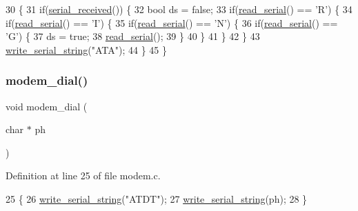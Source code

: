 \begin{DoxyCode}
30                      \{
31     \textcolor{keywordflow}{if}(\hyperlink{a00056_af10f0e64ba89e8635aa7245ca08297c5_af10f0e64ba89e8635aa7245ca08297c5}{serial\_received}()) \{
32         \textcolor{keywordtype}{bool} ds = \textcolor{keyword}{false};
33         \textcolor{keywordflow}{if}(\hyperlink{a00056_ad343a7018f74662f794968dfa0523841_ad343a7018f74662f794968dfa0523841}{read\_serial}() == \textcolor{charliteral}{'R'}) \{
34             \textcolor{keywordflow}{if}(\hyperlink{a00056_ad343a7018f74662f794968dfa0523841_ad343a7018f74662f794968dfa0523841}{read\_serial}() == \textcolor{charliteral}{'I'}) \{
35                 \textcolor{keywordflow}{if}(\hyperlink{a00056_ad343a7018f74662f794968dfa0523841_ad343a7018f74662f794968dfa0523841}{read\_serial}() == \textcolor{charliteral}{'N'}) \{
36                     \textcolor{keywordflow}{if}(\hyperlink{a00056_ad343a7018f74662f794968dfa0523841_ad343a7018f74662f794968dfa0523841}{read\_serial}() == \textcolor{charliteral}{'G'}) \{
37                         ds = \textcolor{keyword}{true};
38                         \hyperlink{a00056_ad343a7018f74662f794968dfa0523841_ad343a7018f74662f794968dfa0523841}{read\_serial}();
39                     \}
40                 \}
41             \}
42         \}
43         \hyperlink{a00056_aabbe45d6670f606c53ba38a5fb14b650_aabbe45d6670f606c53ba38a5fb14b650}{write\_serial\_string}(\textcolor{stringliteral}{"ATA"});
44     \}
45 \}
\end{DoxyCode}
\mbox{\label{a00047_ab1123a026be8f7d0ece72e2813222da0_ab1123a026be8f7d0ece72e2813222da0}} 
\subsubsection{\texorpdfstring{modem\+\_\+dial()}{modem\_dial()}}
{\footnotesize\ttfamily void modem\+\_\+dial (\begin{DoxyParamCaption}\item[{char $\ast$}]{ph }\end{DoxyParamCaption})}



Definition at line 25 of file modem.\+c.


\begin{DoxyCode}
25                           \{
26     \hyperlink{a00056_aabbe45d6670f606c53ba38a5fb14b650_aabbe45d6670f606c53ba38a5fb14b650}{write\_serial\_string}(\textcolor{stringliteral}{"ATDT"});
27     \hyperlink{a00056_aabbe45d6670f606c53ba38a5fb14b650_aabbe45d6670f606c53ba38a5fb14b650}{write\_serial\_string}(ph);
28 \}
\end{DoxyCode}
\mbox{\label{a00047_adf147e13a3c0b23148f4eb1db184f68d_adf147e13a3c0b23148f4eb1db184f68d}} 
